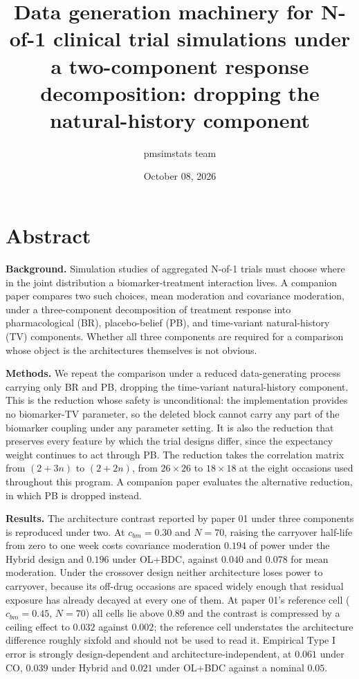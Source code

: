 \documentclass[
  11pt,
]{article}
\title{Data generation machinery for N-of-1 clinical trial simulations under a two-component response decomposition: dropping the natural-history component}
\author{pmsimstats team}
\date{October 08, 2026}
\begin{document}
\maketitle

{
\setcounter{tocdepth}{2}
\tableofcontents
}
\section{Abstract}

\textbf{Background.} Simulation studies of aggregated N-of-1 trials
must choose where in the joint distribution a biomarker-treatment
interaction lives. A companion paper compares two such choices, mean
moderation and covariance moderation, under a three-component
decomposition of treatment response into pharmacological (BR),
placebo-belief (PB), and time-variant natural-history (TV)
components. Whether all three components are required for a
comparison whose object is the architectures themselves is not
obvious.

\textbf{Methods.} We repeat the comparison under a reduced
data-generating process carrying only BR and PB, dropping the
time-variant natural-history component. This is the reduction whose
safety is unconditional: the implementation provides no biomarker-TV
parameter, so the deleted block cannot carry any part of the
biomarker coupling under any parameter setting. It is also the
reduction that preserves every feature by which the trial designs
differ, since the expectancy weight continues to act through PB. The
reduction takes the correlation matrix from \((2 + 3n)\) to \((2 + 2n)\),
from \(26 \times 26\) to \(18 \times 18\) at the eight occasions used
throughout this program. A companion paper evaluates the alternative
reduction, in which PB is dropped instead.

\textbf{Results.} The architecture contrast reported by paper 01 under
three components is reproduced under two. At \(c_{bm} = 0.30\) and
\(N = 70\), raising the carryover half-life from zero to one week costs
covariance moderation \(0.194\) of power under the Hybrid design and
\(0.196\) under OL+BDC, against \(0.040\) and \(0.078\) for mean
moderation. Under the crossover design neither architecture loses
power to carryover, because its off-drug occasions are spaced widely
enough that residual exposure has already decayed at every one of
them. At paper 01's reference cell (\(c_{bm} = 0.45\), \(N = 70\)) all
cells lie above \(0.89\) and the contrast is compressed by a ceiling
effect to \(0.032\) against \(0.002\); the reference cell understates the
architecture difference roughly sixfold and should not be used to
read it. Empirical Type I error is strongly design-dependent and
architecture-independent, at \(0.061\) under CO, \(0.039\) under Hybrid
and \(0.021\) under OL+BDC against a nominal \(0.05\).
\end{document}
